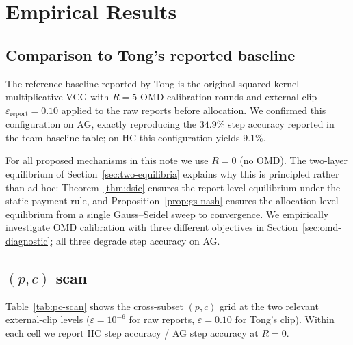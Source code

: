 \documentclass[11pt]{article}
\begin{document}
\section{Empirical Results}
\label{sec:results}

\subsection{Comparison to Tong's reported baseline}
\label{sec:tongs-baseline}

The reference baseline reported by Tong is the original squared-kernel
multiplicative VCG with $R = 5$ OMD calibration rounds and external clip
$\varepsilon_{\text{report}} = 0.10$ applied to the raw reports before
allocation. We confirmed this configuration on AG, exactly reproducing
the $34.9\%$ step accuracy reported in the team baseline table; on HC
this configuration yields $9.1\%$.

For all proposed mechanisms in this note we use $R = 0$ (no OMD). The
two-layer equilibrium of Section~\ref{sec:two-equilibria} explains why this
is principled rather than ad hoc: Theorem~\ref{thm:dsic} ensures the
report-level equilibrium under the static payment rule, and
Proposition~\ref{prop:gs-nash} ensures the allocation-level equilibrium
from a single Gauss--Seidel sweep to convergence. We empirically investigate
OMD calibration with three different objectives in
Section~\ref{sec:omd-diagnostic}; all three degrade step accuracy on AG.

\subsection{$(p, c)$ scan}

Table~\ref{tab:pc-scan} shows the cross-subset $(p, c)$ grid at the two
relevant external-clip levels ($\varepsilon = 10^{-6}$ for raw reports,
$\varepsilon = 0.10$ for Tong's clip). Within each cell we report
HC step accuracy / AG step accuracy at $R = 0$.
\end{document}
